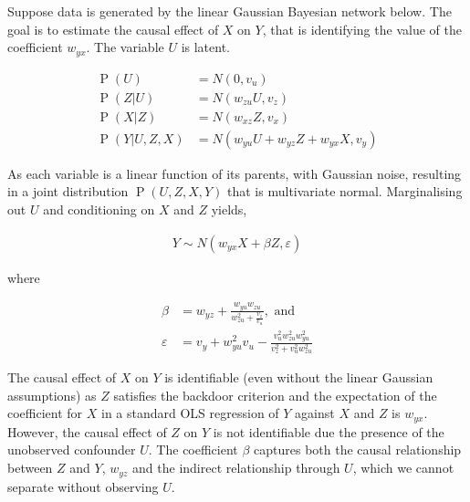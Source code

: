 \documentclass[11pt,a4paper,twoside]{report}
\newcommand{\eqn}[1]{\begin{align}#1\end{align}}
\renewcommand{\P}[1]{\operatorname{P}\left(#1\right)}
\theoremstyle{plain}
\theoremstyle{definition}
\let\epsilon\varepsilon
\begin{document}
Suppose data is generated by the linear Gaussian Bayesian network below. The goal is to estimate the causal effect of $X$ on $Y$, that is identifying the value of the coefficient $w_{yx}$. The variable $U$ is latent. 

\eqn{
\P{U} &= N(0 , v_u) \\
\label{eqn:careful_with_priors}
\P{Z|U} &= N(w_{zu}U , v_z) \\
\P{X|Z} &= N(w_{xz}Z , v_x) \\
\P{Y|U,Z,X} & = N(w_{yu}U +w_{yz}Z + w_{yx}X , v_y)
}

\begin{figure}[ht]
\centering
{} 
\caption{ }
\label{fig:careful_with_priors}
\end{figure}

As each variable is a linear function of its parents, with Gaussian noise, resulting in a joint distribution $\P{U,Z,X,Y}$ that is multivariate normal. Marginalising out $U$ and conditioning on $X$ and $Z$ yields,

\eqn{
Y \sim N(w_{yx} X + \beta Z, \epsilon) 
}

where

\eqn{
\beta &= w_{yz}+\frac{w_{yu}w_{zu}}{w_{zu}^2+\frac{v_z}{v_u}}, \text{ and}\\
\epsilon &= v_y + w_{yu}^2v_u - \frac{v_u^2 w_{zu}^2 w_{yu}^2 }{v_z^2+v_u^2 w_{zu}^2}
}

The causal effect of $X$ on $Y$ is identifiable (even without the linear Gaussian assumptions) as $Z$ satisfies the backdoor criterion and the expectation of the coefficient for $X$ in a standard OLS regression of $Y$ against $X$ and $Z$ is $w_{yx}$. However, the causal effect of $Z$ on $Y$ is not identifiable due the presence of the unobserved confounder $U$. The coefficient $\beta$ captures both the causal relationship between $Z$ and $Y$, $w_{yz}$ and the indirect relationship through $U$, which we cannot separate without observing $U$. 
\end{document}
